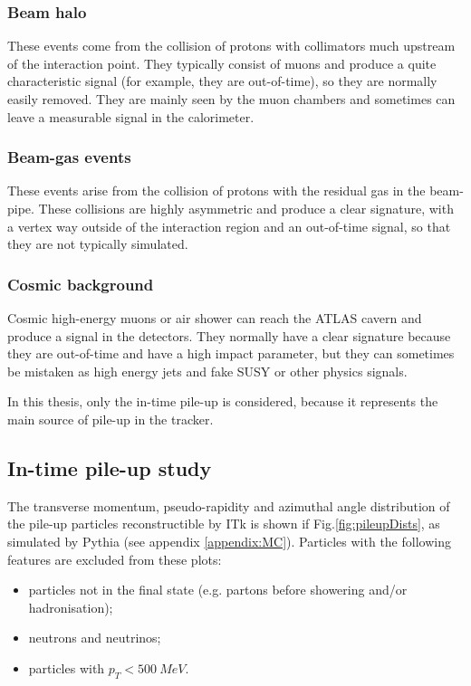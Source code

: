 \documentclass[a4paper,twoside,12pt]{article}
\begin{document}
\subsubsection*{Beam halo}
These events come from the collision of protons with collimators much upstream of the 
interaction point. They typically consist of muons and produce a quite characteristic signal (for example, they are out-of-time), so they are normally easily removed. They are mainly seen by the muon chambers and sometimes
can leave a measurable signal in the calorimeter\cite{ATLAS_pileup}. 

\subsubsection*{Beam-gas events}
These events arise from the collision of protons with the residual gas in the beam-pipe. These
collisions are highly asymmetric and produce a clear signature, with a vertex way outside of
the interaction region and an out-of-time signal, so that they are not typically simulated\cite{ATLAS_pileup}.

\subsubsection*{Cosmic background}
Cosmic high-energy muons or air shower can reach the ATLAS cavern and produce a signal in the detectors.
They normally have a clear signature because they are out-of-time and have a high impact
parameter, but they can sometimes
be mistaken as high energy jets and fake SUSY or other physics signals\cite{ATLAS_cosmic}. \\

\bigskip

In this thesis, only the in-time pile-up is considered, because it represents the main source of
pile-up in the tracker.

\subsection{In-time pile-up study}

The transverse momentum, pseudo-rapidity and azimuthal angle distribution of the pile-up particles reconstructible by ITk is shown if Fig.\ref{fig:pileupDists}, as simulated by 
Pythia (see appendix \ref{appendix:MC}). Particles with the following
features are excluded from these plots:

\begin{itemize}
\item particles not in the final state (e.g. partons before showering and/or hadronisation);
\item neutrons and neutrinos;
\item particles with $p_{T} < 500\ MeV$.
\end{itemize}
\end{document}
